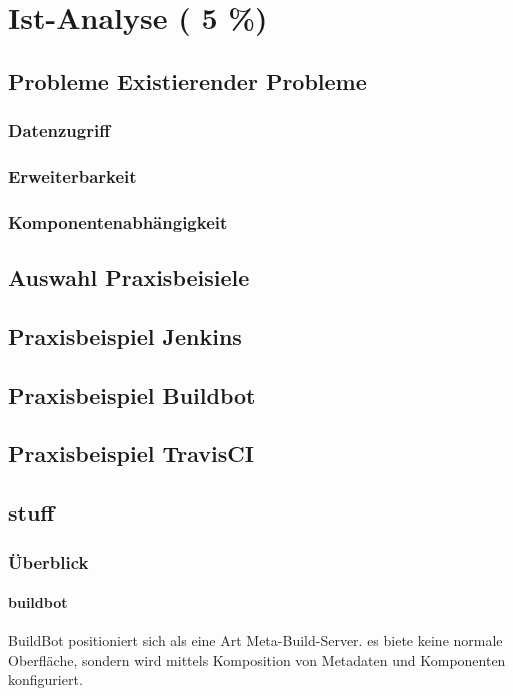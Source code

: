 \chapter{Ist-Analyse ( 5 \%)}

\section{Probleme Existierender Probleme}
\subsection{Datenzugriff}
\subsection{Erweiterbarkeit}
\subsection{Komponentenabh\"angigkeit}
\section{Auswahl Praxisbeisiele}
\section{Praxisbeispiel Jenkins}
\section{Praxisbeispiel Buildbot}
\section{Praxisbeispiel TravisCI}

\section{stuff}
\subsection{Überblick}

\subsubsection{buildbot}

BuildBot positioniert sich als eine Art Meta-Build-Server.
es biete keine normale Oberfläche, sondern wird mittels
Komposition von Metadaten und Komponenten konfiguriert.

